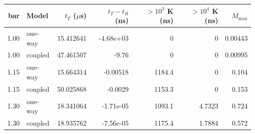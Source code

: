 \begin{tabular}{rlrrrrr}
\toprule
bar & Model & $t_T$ ($\mu$s) & $t_T-t_R$ (ns) & $>10^3$ K (ns) & $>10^4$ K (ns) & $M_{\max}$ \\
\midrule
1.00 & one-way & 15.412641 & -4.68e+03 & 0 & 0 & 0.00443 \\
1.00 & coupled & 47.461507 & -9.76 & 0 & 0 & 0.00995 \\
1.15 & one-way & 15.664314 & -0.00518 & 1184.4 & 0 & 0.104 \\
1.15 & coupled & 50.025868 & -0.0029 & 1153.3 & 0 & 0.153 \\
1.30 & one-way & 18.341064 & -1.71e-05 & 1093.1 & 4.7323 & 0.724 \\
1.30 & coupled & 18.935762 & -7.56e-05 & 1175.4 & 1.7884 & 0.572 \\
\bottomrule
\end{tabular}
